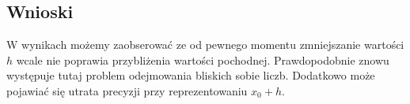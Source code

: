 \documentclass{article}
\begin{document}
\subsection{Wnioski}
    W wynikach możemy zaobserować ze od pewnego momentu zmniejszanie wartości $h$ wcale nie poprawia przybliżenia wartości pochodnej.
    Prawdopodobnie znowu występuje tutaj problem odejmowania bliskich sobie liczb. Dodatkowo może pojawiać się utrata precyzji przy reprezentowaniu $x_{0} + h$.
\end{document}

